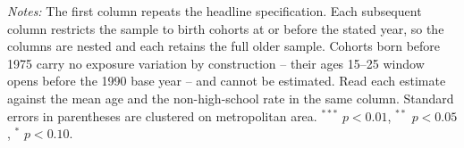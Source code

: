 \begin{table}[!htbp]
\centering
\caption{Estimates by Birth Cohort: Cumulative Restriction to Older Cohorts}
\label{tab:birth_cohort}
\begin{minipage}{\textwidth}
\footnotesize
\vspace{4pt}
\textit{Notes:} The first column repeats the headline specification. Each subsequent column restricts the sample to birth cohorts at or before the stated year, so the columns are nested and each retains the full older sample. Cohorts born before 1975 carry no exposure variation by construction -- their ages 15--25 window opens before the 1990 base year -- and cannot be estimated. Read each estimate against the mean age and the non-high-school rate in the same column. Standard errors in parentheses are clustered on metropolitan area. $^{***}$ $p<0.01$, $^{**}$ $p<0.05$, $^{*}$ $p<0.10$.
\end{minipage}
\end{table}

